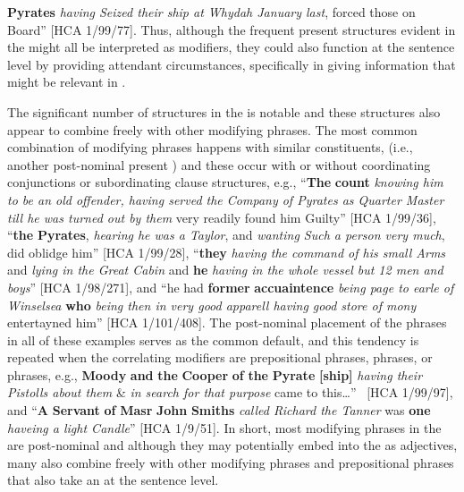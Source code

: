 \textbf{Pyrates} \textit{having Seized their ship at Whydah January last}, forced those on Board” [HCA 1/99/77]. Thus, although the frequent present  structures evident in the  might all be interpreted as  modifiers, they could also function at the sentence level by providing attendant circumstances, specifically in giving information that might be relevant in . 

The significant number of  structures in the  is notable and these structures also appear to combine freely with other modifying phrases. The most common combination of modifying phrases happens with similar constituents, (i.e., another post-nominal present ) and these occur with or without coordinating conjunctions or subordinating clause structures, e.g.,  “\textbf{The} \textbf{count} \textit{knowing him to be an old offender, having served the Company of Pyrates as Quarter Master till he was turned out by them} very readily found him Guilty” [HCA 1/99/36], “\textbf{the} \textbf{Pyrates}, \textit{hearing he was a Taylor}, and \textit{wanting Such a person very much}, did oblidge him” [HCA 1/99/28], “\textbf{they} \textit{having the command of his small Arms} and \textit{lying in the Great Cabin} and \textbf{he} \textit{having in the whole vessel but 12 men and boys}” [HCA 1/98/271], and “he had \textbf{former} \textbf{accuaintence} \textit{being page to earle of Winselsea} \textbf{who} \textit{being then in very good apparell having good store of mony} entertayned him” [HCA 1/101/408]. The post-nominal placement of the  phrases in all of these examples serves as the common default, and this tendency is repeated when the correlating modifiers are prepositional phrases,  phrases, or  phrases, e.g., \textbf{Moody} \textbf{and} \textbf{the} \textbf{Cooper} \textbf{of} \textbf{the} \textbf{Pyrate} \textbf{[ship]} \textit{having their Pistolls about them} \& \textit{in search for that purpose} came to this…” ~[HCA 1/99/97], and “\textbf{A} \textbf{Servant} \textbf{of} \textbf{Masr} \textbf{John} \textbf{Smiths} \textit{called Richard the Tanner} was \textbf{one} \textit{haveing a light Candle}” [HCA 1/9/51]. In short, most modifying  phrases in the  are post-nominal and although they may potentially embed into the  as adjectives, many also combine freely with other modifying  phrases and prepositional phrases that also take an  at the sentence level. 

